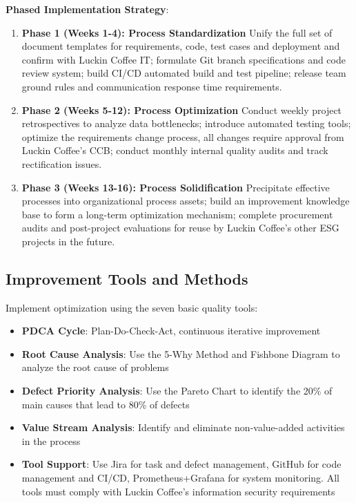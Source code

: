 \documentclass[12pt,a4paper]{article}
\begin{document}
\textbf{Phased Implementation Strategy}:
\begin{enumerate}[leftmargin=*]
    \item \textbf{Phase 1 (Weeks 1-4): Process Standardization}
    Unify the full set of document templates for requirements, code, test cases and deployment and confirm with Luckin Coffee IT; formulate Git branch specifications and code review system; build CI/CD automated build and test pipeline; release team ground rules and communication response time requirements.

    \item \textbf{Phase 2 (Weeks 5-12): Process Optimization}
    Conduct weekly project retrospectives to analyze data bottlenecks; introduce automated testing tools; optimize the requirements change process, all changes require approval from Luckin Coffee's CCB; conduct monthly internal quality audits and track rectification issues.

    \item \textbf{Phase 3 (Weeks 13-16): Process Solidification}
    Precipitate effective processes into organizational process assets; build an improvement knowledge base to form a long-term optimization mechanism; complete procurement audits and post-project evaluations for reuse by Luckin Coffee's other ESG projects in the future.
\end{enumerate}

\subsection{Improvement Tools and Methods}
Implement optimization using the seven basic quality tools:
\begin{itemize}[leftmargin=*]
    \item \textbf{PDCA Cycle}: Plan-Do-Check-Act, continuous iterative improvement
    \item \textbf{Root Cause Analysis}: Use the 5-Why Method and Fishbone Diagram to analyze the root cause of problems
    \item \textbf{Defect Priority Analysis}: Use the Pareto Chart to identify the 20\% of main causes that lead to 80\% of defects
    \item \textbf{Value Stream Analysis}: Identify and eliminate non-value-added activities in the process
    \item \textbf{Tool Support}: Use Jira for task and defect management, GitHub for code management and CI/CD, Prometheus+Grafana for system monitoring. All tools must comply with Luckin Coffee's information security requirements
\end{itemize}
\end{document}
